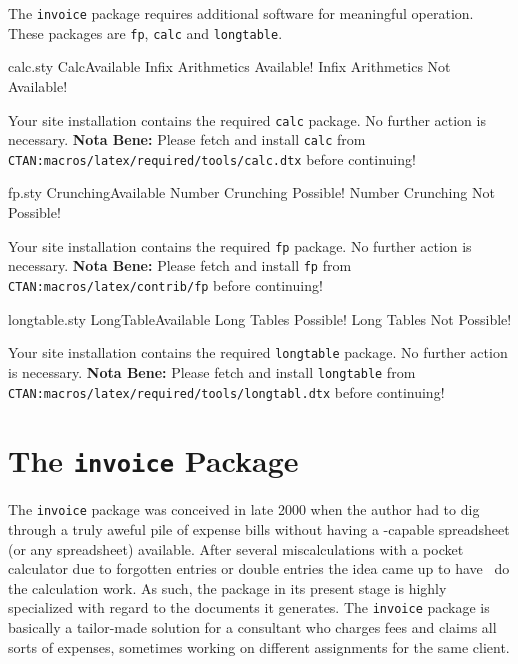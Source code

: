 \documentclass[11pt]{ltxdoc}
\begin{document}
	\begin{sloppy}
	The \texttt{invoice} package requires additional %
	software for meaningful operation. These packages are
	\texttt{fp}, \texttt{calc} and \texttt{longtable}.

	\PackageDiagnostics%
	{calc.sty}				%
	{CalcAvailable}				%
	{Infix Arithmetics Available!}		%
	{Infix Arithmetics Not Available!}	%

	\ifnum{}
		Your site installation contains the required \texttt{calc}
		package. No further action is necessary.
	\else
		\textbf{Nota Bene:} Please fetch and install \texttt{calc}
		from
		\texttt{CTAN:macros/latex/required/tools/calc.dtx} before
		continuing!
	\fi

	\PackageDiagnostics%
	{fp.sty}				%
	{CrunchingAvailable}			%
	{Number Crunching Possible!}		%
	{Number Crunching Not Possible!}	%

	\ifnum{}
		Your site installation contains the required
		\texttt{fp}
		package. No further action is necessary.
	\else
		\textbf{Nota Bene:} Please fetch and install \texttt{fp}
		from \texttt{CTAN:macros/latex/contrib/fp} before continuing!
	\fi

	\PackageDiagnostics%
	{longtable.sty}				%
	{LongTableAvailable}			%
	{Long Tables Possible!}			%
	{Long Tables Not Possible!}		%

	\ifnum{}
		Your site installation contains the required
		\texttt{longtable}
		package. No further action is necessary.
	\else
		\textbf{Nota Bene:} Please fetch and install \texttt{longtable}
		from \texttt{CTAN:macros/latex/required/tools/longtabl.dtx}
		before continuing!
	\fi

	\addtocounter{AllInPlace}{\theCalcAvailable}
	\addtocounter{AllInPlace}{\theCrunchingAvailable}
	\addtocounter{AllInPlace}{\theLongTableAvailable}

	\ifnum{}
		\section{The \texttt{invoice} Package}

		The \texttt{invoice} package was conceived in late 2000
		when the author had to dig through a truly aweful pile
		of expense bills without having a \LaTeXe-capable
		spreadsheet (or any spreadsheet) available. After several
		miscalculations with a pocket calculator due to forgotten
		entries or double entries the idea came up to have \LaTeXe\
		do the calculation work. As such, the package in its present
		stage is highly specialized with regard to the documents it
		generates. The \texttt{invoice} package is basically a
		tailor-made solution for a consultant who charges fees and
		claims all sorts of expenses, sometimes working on different
		assignments for the same client.


\end{sloppy}
\end{document}
